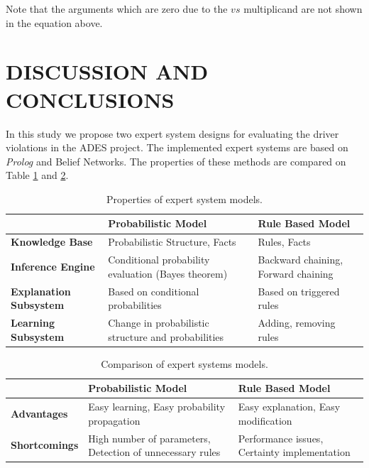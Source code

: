 \documentclass[letterpaper, 10 pt, conference]{ieeeconf}
\begin{document}
\noindent
Note that the arguments which are zero due to the $vs$ multiplicand are not shown in the equation above. 

\section{DISCUSSION AND CONCLUSIONS}
\label{sec:conc}

In this study we propose two expert system designs for evaluating the driver violations in the ADES project. The implemented expert systems are based on \textit{Prolog} and Belief Networks. The properties of these methods are compared on Table \ref{tab1} and \ref{tab2}.

\begin{table}[!ht]
\caption{Properties of expert system models.}
\centering
{\scriptsize
\begin{tabular}{|p{13mm}|p{30mm}|p{30mm}|}
\hline
 & {\bf Probabilistic Model} & {\bf Rule Based Model} \\
\hline
{\bf Knowledge Base} & Probabilistic Structure,  Facts & Rules, Facts \\
\hline
{\bf Inference Engine} & Conditional probability evaluation (Bayes theorem) & Backward chaining, Forward chaining \\
\hline
{\bf Explanation Subsystem} & Based on conditional probabilities & Based on triggered rules \\
\hline
{\bf Learning Subsystem} & Change in probabilistic structure and probabilities & Adding, removing rules \\
\hline
\end{tabular}
}
\label{tab1}
\end{table}

\begin{table}[!ht]
\caption{Comparison of expert systems models.}
\centering
{\scriptsize
\begin{tabular}{|p{13mm}|p{30mm}|p{30mm}|}
\hline
 & {\bf Probabilistic Model} & {\bf Rule Based Model} \\
\hline
{\bf Advantages} & Easy learning, Easy probability propagation & Easy explanation, Easy modification \\
\hline
{\bf Shortcomings} & High number of parameters, Detection of unnecessary rules & Performance issues, Certainty implementation \\
\hline
\end{tabular}  
}
\label{tab2}
\vskip -5pt
\end{table}
\end{document}
